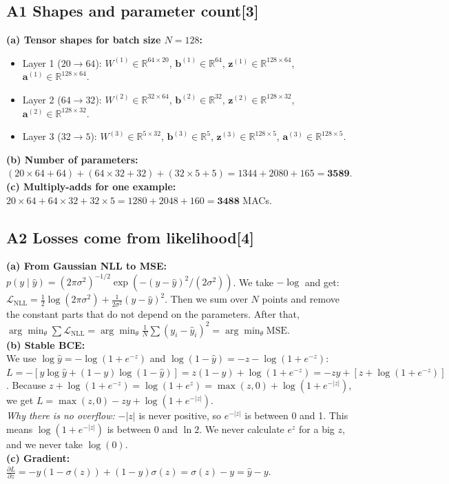 \documentclass[conference,a4paper]{IEEEtran}
\newcommand{\task}[2]{\subsection{#1\hfill[#2]}}
\begin{document}
\task{A1 Shapes and parameter count}{3}
\textbf{(a) Tensor shapes for batch size $N=128$:}
\begin{itemize}\setlength{\itemsep}{0pt}
  \item Layer 1 ($20\to64$): $W^{(1)} \in \mathbb{R}^{64\times 20}$, $\mathbf{b}^{(1)} \in \mathbb{R}^{64}$, $\mathbf{z}^{(1)} \in \mathbb{R}^{128\times 64}$, $\mathbf{a}^{(1)} \in \mathbb{R}^{128\times 64}$.
  \item Layer 2 ($64\to32$): $W^{(2)} \in \mathbb{R}^{32\times 64}$, $\mathbf{b}^{(2)} \in \mathbb{R}^{32}$, $\mathbf{z}^{(2)} \in \mathbb{R}^{128\times 32}$, $\mathbf{a}^{(2)} \in \mathbb{R}^{128\times 32}$.
  \item Layer 3 ($32\to5$): $W^{(3)} \in \mathbb{R}^{5\times 32}$, $\mathbf{b}^{(3)} \in \mathbb{R}^{5}$, $\mathbf{z}^{(3)} \in \mathbb{R}^{128\times 5}$, $\mathbf{a}^{(3)} \in \mathbb{R}^{128\times 5}$.
\end{itemize}
\textbf{(b) Number of parameters:}
$(20\times 64 + 64) + (64\times 32 + 32) + (32\times 5 + 5) = 1344 + 2080 + 165 = \mathbf{3589}$.\\
\textbf{(c) Multiply-adds for one example:}
$20\times 64 + 64\times 32 + 32\times 5 = 1280 + 2048 + 160 = \mathbf{3488}$ MACs.

\task{A2 Losses come from likelihood}{4}
\textbf{(a) From Gaussian NLL to MSE:}\\
$p(y\mid\hat y) = (2\pi\sigma^2)^{-1/2}\exp(-(y-\hat y)^2/(2\sigma^2))$. We take $-\log$ and get:
$\mathcal{L}_{\text{NLL}} = \frac{1}{2}\log(2\pi\sigma^2) + \frac{1}{2\sigma^2}(y-\hat y)^2$.
Then we sum over $N$ points and remove the constant parts that do not depend on the parameters. After that, $\arg\min_\theta \sum \mathcal{L}_{\text{NLL}} = \arg\min_\theta \frac{1}{N}\sum (y_i-\hat y_i)^2 = \arg\min_\theta \text{MSE}$.\\[2pt]
\textbf{(b) Stable BCE:}\\
We use $\log\hat y = -\log(1+e^{-z})$ and $\log(1-\hat y) = -z-\log(1+e^{-z})$:
$L = -[y\log\hat y + (1-y)\log(1-\hat y)] = z(1-y) + \log(1+e^{-z}) = -zy + [z + \log(1+e^{-z})]$.
Because $z + \log(1+e^{-z}) = \log(1+e^z) = \max(z,0) + \log(1+e^{-|z|})$, we get
$L = \max(z,0) - zy + \log(1+e^{-|z|})$.\\
\emph{Why there is no overflow:} $-|z|$ is never positive, so $e^{-|z|}$ is between 0 and 1. This means $\log(1+e^{-|z|})$ is between 0 and $\ln 2$. We never calculate $e^{z}$ for a big $z$, and we never take $\log(0)$.\\[2pt]
\textbf{(c) Gradient:}\\
$\frac{\partial L}{\partial z} = -y(1-\sigma(z)) + (1-y)\sigma(z) = \sigma(z) - y = \hat y - y$.
\end{document}
